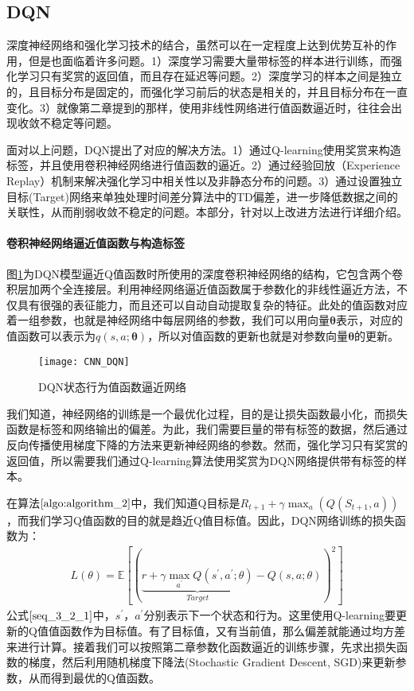 \subsection{DQN}
 深度神经网络和强化学习技术的结合，虽然可以在一定程度上达到优势互补的作用，但是也面临着许多问题。1）深度学习需要大量带标签的样本进行训练，而强化学习只有奖赏的返回值，而且存在延迟等问题。2）深度学习的样本之间是独立的，且目标分布是固定的，而强化学习前后的状态是相关的，并且目标分布在一直变化。3）就像第二章提到的那样，使用非线性网络进行值函数逼近时，往往会出现收敛不稳定等问题。

 面对以上问题，DQN提出了对应的解决方法。1）通过Q-learning使用奖赏来构造标签，并且使用卷积神经网络进行值函数的逼近。2）通过经验回放（Experience Replay）机制来解决强化学习中相关性以及非静态分布的问题。3）通过设置独立目标(Target)网络来单独处理时间差分算法中的TD偏差，进一步降低数据之间的关联性，从而削弱收敛不稳定的问题。本部分，针对以上改进方法进行详细介绍。

 \paragraph{卷积神经网络逼近值函数与构造标签}
图\ref{fig:CNN_DQN}为DQN模型逼近Q值函数时所使用的深度卷积神经网络的结构，它包含两个卷积层加两个全连接层。利用神经网络逼近值函数属于参数化的非线性逼近方法，不仅具有很强的表征能力，而且还可以自动自动提取复杂的特征。此处的值函数对应着一组参数，也就是神经网络中每层网络的参数，我们可以用向量$\mathbf{\theta}$表示，对应的值函数可以表示为$q(s,a;\mathbf{\theta})$，所以对值函数的更新也就是对参数向量$\mathbf{\theta}$的更新。
\begin{figure}[htbp]
\centering
\texttt{[image: CNN\_DQN]}
\caption{DQN状态行为值函数逼近网络}
\label{fig:CNN_DQN}
\end{figure}

我们知道，神经网络的训练是一个最优化过程，目的是让损失函数最小化，而损失函数是标签和网络输出的偏差。为此，我们需要巨量的带有标签的数据，然后通过反向传播使用梯度下降的方法来更新神经网络的参数。然而，强化学习只有奖赏的返回值，所以需要我们通过Q-learning算法使用奖赏为DQN网络提供带有标签的样本。

在算法$\ref{algo:algorithm_2}$中，我们知道Q目标是$R_{t+1}+\gamma \max_{a}(Q(S_{t+1},a))$，而我们学习Q值函数的目的就是趋近Q值目标值。因此，DQN网络训练的损失函数为：
\begin{equation}
\label{seq_3_2_1}
\begin{aligned}
L(\theta)=\mathbb{E}[(\underbrace{r+\gamma\max_{a^{'}} Q(s^{'},a^{'};\theta)}_{Target}-Q(s,a;\theta))^{2}]
\end{aligned}
\end{equation}
公式$\eqref{seq_3_2_1}$中，$s^{'}$，$a^{'}$分别表示下一个状态和行为。这里使用Q-learning要更新的Q值值函数作为目标值。有了目标值，又有当前值，那么偏差就能通过均方差来进行计算。接着我们可以按照第二章参数化函数逼近的训练步骤，先求出损失函数的梯度，然后利用随机梯度下降法(Stochastic Gradient Descent, SGD)来更新参数，从而得到最优的Q值函数。

